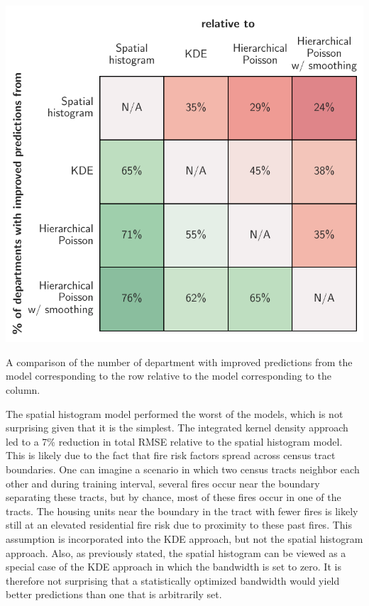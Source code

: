 \documentclass{svjour3}
\begin{document}
    \begin{table}[htb] \centering
    \includegraphics[width=.75\textwidth]{figures/department_comparison.pdf}
    \caption{A comparison of the number of department with improved predictions from the model corresponding to the row relative to the model corresponding to the column.}
    \label{table:dep_comparison}
    \end{table}
    
    
    The spatial histogram model performed the worst of the models, which is not surprising given that it is the simplest. The integrated kernel density approach led to a 7\% reduction in total RMSE relative to the spatial histogram model. This is likely due to the fact that fire risk factors spread across census tract boundaries. One can imagine a scenario in which two census tracts neighbor each other and during training interval, several fires occur near the boundary separating these tracts, but by chance, most of these fires occur in one of the tracts. The housing units near the boundary in the tract with fewer fires is likely still at an elevated residential fire risk due to proximity to these past fires. This assumption is incorporated into the KDE approach, but not the spatial histogram approach. Also, as previously stated, the spatial histogram can be viewed as a special case of the KDE approach in which the bandwidth is set to zero. It is therefore not surprising that a statistically optimized bandwidth would yield better predictions than one that is arbitrarily set. 
    
\end{document}
